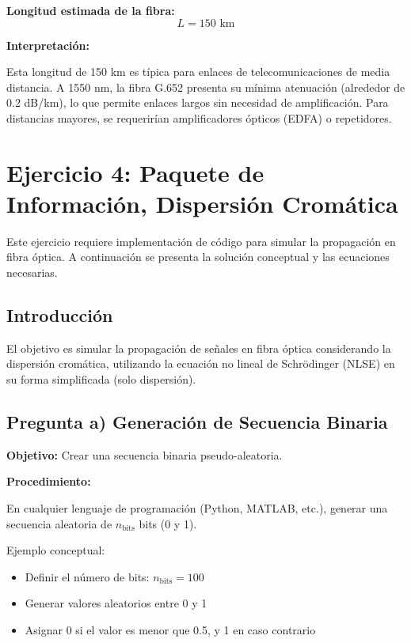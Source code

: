 \documentclass[11pt,a4paper]{article}
\begin{document}
\textbf{Longitud estimada de la fibra:}
\begin{equation}
    L = 150 \text{ km}
\end{equation}

\textbf{Interpretación:}

Esta longitud de 150 km es típica para enlaces de telecomunicaciones de media distancia. A 1550 nm, la fibra G.652 presenta su mínima atenuación (alrededor de 0.2 dB/km), lo que permite enlaces largos sin necesidad de amplificación. Para distancias mayores, se requerirían amplificadores ópticos (EDFA) o repetidores.

\section{Ejercicio 4: Paquete de Información, Dispersión Cromática}

Este ejercicio requiere implementación de código para simular la propagación en fibra óptica. A continuación se presenta la solución conceptual y las ecuaciones necesarias.

\subsection{Introducción}

El objetivo es simular la propagación de señales en fibra óptica considerando la dispersión cromática, utilizando la ecuación no lineal de Schrödinger (NLSE) en su forma simplificada (solo dispersión).

\subsection{Pregunta a) Generación de Secuencia Binaria}

\textbf{Objetivo:} Crear una secuencia binaria pseudo-aleatoria.

\textbf{Procedimiento:}

En cualquier lenguaje de programación (Python, MATLAB, etc.), generar una secuencia aleatoria de $n_{\text{bits}}$ bits (0 y 1).

Ejemplo conceptual:
\begin{itemize}
    \item Definir el número de bits: $n_{\text{bits}} = 100$
    \item Generar valores aleatorios entre 0 y 1
    \item Asignar 0 si el valor es menor que 0.5, y 1 en caso contrario
\end{itemize}
\end{document}

